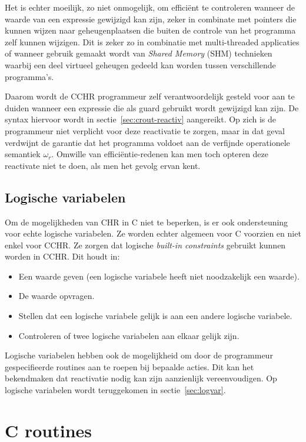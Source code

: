 Het is echter moeilijk, zo niet onmogelijk, om effici\"ent te controleren wanneer de waarde van een expressie gewijzigd kan zijn, zeker in combinate met pointers die kunnen wijzen naar geheugenplaatsen die buiten de controle van het programma zelf kunnen wijzigen. Dit is zeker zo in combinatie met multi-threaded applicaties of wanneer gebruik gemaakt wordt van {\em Shared Memory} (SHM) technieken waarbij een deel virtueel geheugen gedeeld kan worden tussen verschillende programma's.

Daarom wordt de CCHR programmeur zelf verantwoordelijk gesteld voor aan te duiden wanneer een expressie die als guard gebruikt wordt gewijzigd kan zijn. De syntax hiervoor wordt in sectie~\ref{sec:crout-reactiv} aangereikt. Op zich is de programmeur niet verplicht voor deze reactivatie te zorgen, maar in dat geval verdwijnt de garantie dat het programma voldoet aan de verfijnde operationele semantiek $\omega_r$. Omwille van effici\"entie-redenen kan men toch opteren deze reactivate niet te doen, als men het gevolg ervan kent.

\subsection{Logische variabelen}

Om de mogelijkheden van CHR in C niet te beperken, is er ook ondersteuning voor echte logische variabelen. Ze worden echter algemeen voor C voorzien en niet enkel voor CCHR. Ze zorgen dat logische {\em built-in constraints} gebruikt kunnen worden in CCHR. Dit houdt in: \begin{itemize}
  \item Een waarde geven (een logische variabele heeft niet noodzakelijk een waarde).
  \item De waarde opvragen.
  \item Stellen dat een logische variabele gelijk is aan een andere logische variabele.
  \item Controleren of twee logische variabelen aan elkaar gelijk zijn.
\end{itemize}

Logische variabelen hebben ook de mogelijkheid om door de programmeur gespecifieerde routines aan te roepen bij bepaalde acties. Dit kan het bekendmaken dat reactivatie nodig kan zijn aanzienlijk vereenvoudigen. Op logische variabelen wordt teruggekomen in sectie~\ref{sec:logvar}.

\section{C routines}

